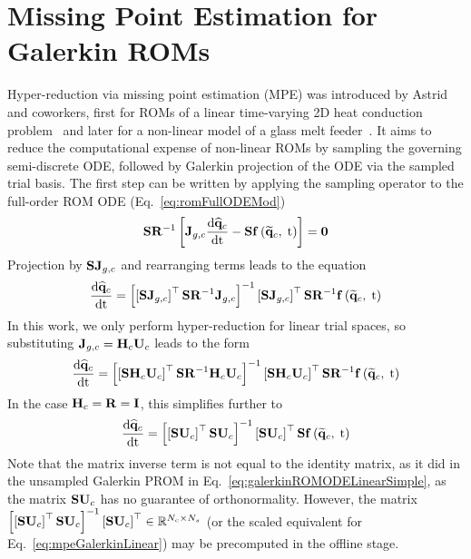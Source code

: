 
\section{Missing Point Estimation for Galerkin ROMs}

Hyper-reduction via missing point estimation (MPE) was introduced by Astrid and coworkers, first for ROMs of a linear time-varying 2D heat conduction problem~\cite{Astrid2004} and later for a non-linear model of a glass melt feeder~\cite{Astrid2008}. It aims to reduce the computational expense of non-linear ROMs by sampling the governing semi-discrete ODE, followed by Galerkin projection of the ODE via the sampled trial basis. The first step can be written by applying the sampling operator to the full-order ROM ODE (Eq.~\ref{eq:romFullODEMod})
%
\begin{equation}
    \sampMat \resScaleInv \left[\jacobDecodeCons \ode{\consVecCoef}{\timeVar} - \sampMat \rhsFunc{\consVecRom, \; \timeVar}\right] = \zeroVec
\end{equation}
%
Projection by $\mathbf{S} \mathbf{J}_{g,c}$ and rearranging terms leads to the equation
%
\begin{equation}
	\ode{\consVecCoef}{\timeVar} = \left[ \left[\sampMat \jacobDecodeCons\right]^\top \sampMat \resScaleInv \jacobDecodeCons\right]^{-1} \left[\sampMat \jacobDecodeCons\right]^\top \sampMat \resScaleInv \rhsFunc{\consVecRom, \; \timeVar}
\end{equation}
%
In this work, we only perform hyper-reduction for linear trial spaces, so substituting $\jacobDecodeCons = \consScale \consTrial$ leads to the form
%
\begin{equation}\label{eq:mpeGalerkinLinear}
	\ode{\consVecCoef}{\timeVar} = \left[ \left[\sampMat \consScale \consTrial \right]^\top \sampMat \resScaleInv \consScale \consTrial \right]^{-1} \left[\sampMat \consScale \consTrial \right]^\top \sampMat \resScaleInv \rhsFunc{\consVecRom, \; \timeVar}
\end{equation}
%
In the case $\consScale = \resScale = \identMat$, this simplifies further to
%
\begin{equation}
	\ode{\consVecCoef}{\timeVar} = \left[ \left[\sampMat \consTrial \right]^\top \sampMat \consTrial \right]^{-1} \left[\sampMat \consTrial \right]^\top \sampMat \rhsFunc{\consVecRom, \; \timeVar}
\end{equation}
%
Note that the matrix inverse term is not equal to the identity matrix, as it did in the unsampled Galerkin PROM in Eq.~\ref{eq:galerkinROMODELinearSimple}, as the matrix $\sampMat \consTrial$ has no guarantee of orthonormality. However, the matrix $\left[ \left[\sampMat \consTrial \right]^\top \sampMat \consTrial \right]^{-1} \left[\sampMat \consTrial \right]^\top \inRTwo{\numConsModes}{\numSamps}$ (or the scaled equivalent for Eq.~\ref{eq:mpeGalerkinLinear}) may be precomputed in the offline stage.

